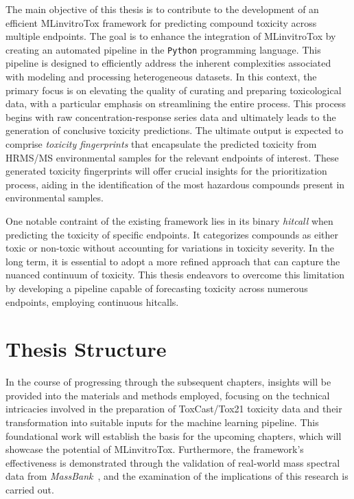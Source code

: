 The main objective of this thesis is to contribute to the development of an efficient MLinvitroTox framework for predicting compound toxicity across multiple endpoints. The goal is to enhance the integration of MLinvitroTox by creating an automated pipeline in the \texttt{Python} programming language. This pipeline is designed to efficiently address the inherent complexities associated with modeling and processing heterogeneous datasets. In this context, the primary focus is on elevating the quality of curating and preparing toxicological data, with a particular emphasis on streamlining the entire process. This process begins with raw concentration-response series data and ultimately leads to the generation of conclusive toxicity predictions. The ultimate output is expected to comprise \emph{toxicity fingerprints} that encapsulate the predicted toxicity from HRMS/MS environmental samples for the relevant endpoints of interest. These generated toxicity fingerprints will offer crucial insights for the prioritization process, aiding in the identification of the most hazardous compounds present in environmental samples.

One notable contraint of the existing framework lies in its binary \emph{hitcall} when predicting the toxicity of specific endpoints. It categorizes compounds as either toxic or non-toxic without accounting for variations in toxicity severity. In the long term, it is essential to adopt a more refined approach that can capture the nuanced continuum of toxicity. This thesis endeavors to overcome this limitation by developing a pipeline capable of forecasting toxicity across numerous endpoints, employing continuous hitcalls.



\section{Thesis Structure}

In the course of progressing through the subsequent chapters, insights will be provided into the materials and methods employed, focusing on the technical intricacies involved in the preparation of ToxCast/Tox21 toxicity data and their transformation into suitable inputs for the machine learning pipeline. This foundational work will establish the basis for the upcoming chapters, which will showcase the potential of MLinvitroTox. Furthermore, the framework's effectiveness is demonstrated through the validation of real-world mass spectral data from \emph{MassBank}~\cite{massbank}, and the examination of the implications of this research is carried out.
